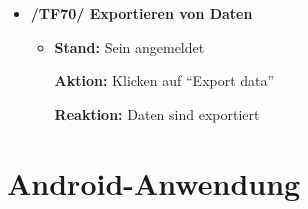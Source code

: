 \documentclass[a4paper]{scrreprt}
\begin{document}
\begin{itemize}
                \item \textbf{/TF70/ Exportieren von Daten}
                \begin{itemize}
                    \item \par \textbf{Stand: }Sein angemeldet
                          \par \textbf{Aktion: }Klicken auf ``Export data''
                          \par \textbf{Reaktion: }Daten sind exportiert
                \end{itemize}


            \end{itemize}


        \vspace*{2cm}
        \section{Android-Anwendung}
\end{document}
